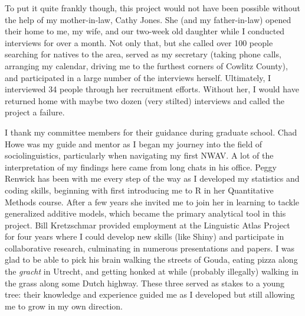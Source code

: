 To put it quite frankly though, this project would not have been possible without the help of my mother-in-law, Cathy Jones. She (and my father-in-law) opened their home to me, my wife, and our two-week old daughter while I conducted interviews for over a month. Not only that, but she called over 100 people searching for natives to the area, served as my secretary (taking phone calls, arranging my calendar, driving me to the furthest corners of Cowlitz County), and participated in a large number of the interviews herself. Ultimately, I interviewed 34 people through her recruitment efforts. Without her, I would have returned home with maybe two dozen (very stilted) interviews and called the project a failure.

I thank my committee members for their guidance during graduate school. Chad Howe was my guide and mentor as I began my journey into the field of sociolinguistics, particularly when navigating my first NWAV. A lot of the interpretation of my findings here came from long chats in his office. Peggy Renwick has been with me every step of the way as I developed my statistics and coding skills, beginning with first introducing me to R in her Quantitative Methods course. After a few years she invited me to join her in learning to tackle generalized additive models, which became the primary analytical tool in this project. Bill Kretzschmar provided employment at the Linguistic Atlas Project for four years where I could develop new skills (like Shiny) and participate in collaborative research, culminating in numerous presentations and papers. I was glad to be able to pick his brain walking the streets of Gouda, eating pizza along the \textit{gracht} in Utrecht, and getting honked at while (probably illegally) walking in the grass along some Dutch highway. These three served as stakes to a young tree: their knowledge and experience guided me as I developed but still allowing me to grow in my own direction.


